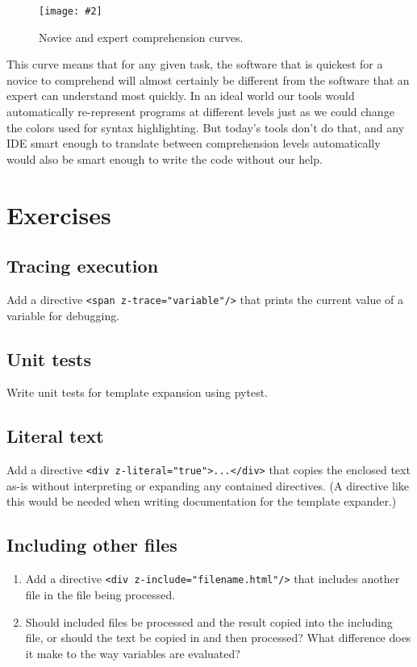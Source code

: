 \documentclass{scrbook}
\newcommand{\figpdf}[4]{\begin{figure}%
\centering%
\texttt{[image: \#2]}%
\caption{#3}%
\label{#1}%
\end{figure}}
\begin{document}
\figpdf{templating-comprehension}{./templating/comprehension.pdf}{Novice and expert comprehension curves.}{0.6}


This curve means that for any given task,
the software that is quickest for a novice to comprehend
will almost certainly be different from the software that
an expert can understand most quickly.
In an ideal world our tools would automatically re-represent programs at different levels
just as we could change the colors used for syntax highlighting.
But today's tools don't do that,
and any IDE smart enough to translate between comprehension levels automatically
would also be smart enough to write the code without our help.

\section{Exercises}\label{templating-exercises}

\subsection*{Tracing execution}


Add a directive \texttt{<span z-trace="variable"/>}
that prints the current value of a variable for debugging.

\subsection*{Unit tests}


Write unit tests for template expansion using pytest.

\subsection*{Literal text}


Add a directive \texttt{<div z-literal="true">...</div>} that copies the enclosed text as-is
without interpreting or expanding any contained directives.
(A directive like this would be needed when writing documentation for the template expander.)

\subsection*{Including other files}

\begin{enumerate}

\item 

Add a directive \texttt{<div z-include="filename.html"/>} that includes another file
    in the file being processed.



\item 

Should included files be processed and the result copied into the including file,
    or should the text be copied in and then processed?
    What difference does it make to the way variables are evaluated?



\end{enumerate}
\end{document}

